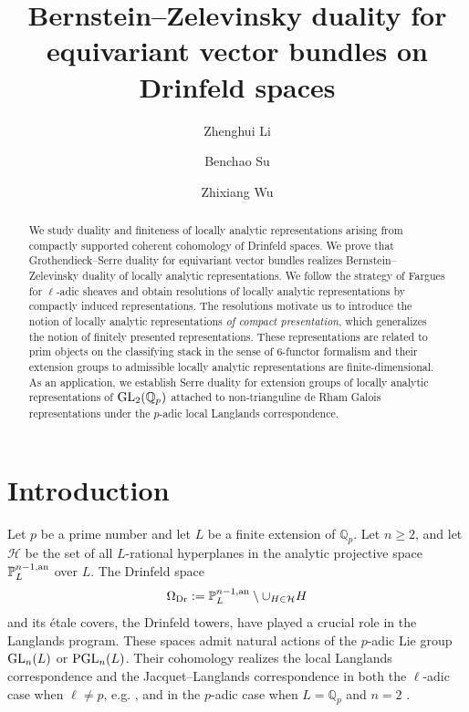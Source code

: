 \documentclass[a4paper,10pt]{amsart}
\theoremstyle{remark}
\theoremstyle{definition}
\theoremstyle{plain}
\numberwithin{equation}{section}
\newcommand{\bbP}{{\mathbb P}}
\newcommand{\bbQ}{{\mathbb Q}}
\newcommand{\calH}{{\mathcal H}}
\newcommand{\an}{{\rm an}}
\newcommand{\GL}{{\rm GL}}
\newcommand{\PGL}{{\rm PGL}}
\begin{document}
\title{Bernstein--Zelevinsky duality for equivariant vector bundles on Drinfeld spaces}

\author{Zhenghui Li}
\address{Institute for Advanced Study, 1 Einstein Dr, Princeton, NJ 08540, U.S.A.}
\author{Benchao Su}
\address{IMJ-PRG, Sorbonne Universit\'e, 4 place Jussieu,
75005 Paris, France}
\author{Zhixiang Wu}
\address{School of Mathematical Sciences, University of Science and Technology of China, 96 Jinzhai Road, 230026 Hefei, China}

\begin{abstract}
We study duality and finiteness of locally analytic representations arising from compactly supported coherent cohomology of Drinfeld spaces. We prove that Grothendieck--Serre duality for equivariant vector bundles realizes Bernstein--Zelevinsky duality of locally analytic representations. We follow the strategy of Fargues for $\ell$-adic sheaves and obtain resolutions of locally analytic representations by compactly induced representations. The resolutions motivate us to introduce the notion of locally analytic representations \emph{of compact presentation}, which generalizes the notion of finitely presented representations. These representations are related to prim objects on the classifying stack in the sense of $6$-functor formalism and their extension groups to admissible locally analytic representations are finite-dimensional. As an application, we establish Serre duality for extension groups of locally analytic representations of $\GL_2(\bbQ_p)$ attached to non-trianguline de Rham Galois representations under the $p$-adic local Langlands correspondence.
\end{abstract}
\maketitle
\tableofcontents

\section{Introduction}
Let $p$ be a prime number and let $L$ be a finite extension of $\bbQ_p$. Let $n\geq 2$, and let $\calH$ be the set of all $L$-rational hyperplanes in the analytic projective space $\bbP^{n-1,\an}_L$ over $L$. The Drinfeld space \cite{drinfeld1974elliptic}
\begin{equation}\label{equationDrinfeldspace}
	\Omega_{\rm Dr}:=\bbP^{n-1,\an}_{L}\setminus \cup_{H\in \calH}H
\end{equation}
and its \'etale covers, the Drinfeld towers, have played a crucial role in the Langlands program. These spaces admit natural actions of the $p$-adic Lie group $\GL_n(L)$ or $\PGL_n(L)$. Their cohomology realizes the local Langlands correspondence and the Jacquet--Langlands correspondence in both the $\ell$-adic case when $\ell\neq p$, e.g. \cite{harrisTaylor2001,farguesGenestierLafforgue2008,dat2007theorie}, and in the $p$-adic case when $ L=\bbQ_p$ and $n=2$ \cite{dospinescuLeBras2017revetements, colmezDospinescuNiziol2020}. 
\end{document}

